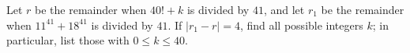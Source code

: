 Let $r$ be the remainder when $40!+k$ is divided by $41$, and let $r_1$ be the remainder when $11^{41}+18^{41}$ is divided by $41$. If $|r_1-r|=4$, find all possible integers $k$; in particular, list those with $0\le k\le40$.

